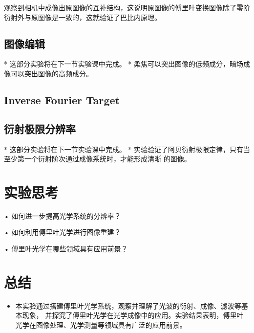 \documentclass{ctexart}
\begin{document}
观察到相机中成像出原图像的互补结构，这说明原图像的傅里叶变换图像除了零阶衍射外与原图像是一致的，这就验证了巴比内原理。

\subsection{图像编辑}
* 这部分实验将在下一节实验课中完成。
* 柔焦可以突出图像的低频成分，暗场成像可以突出图像的高频成分。
\subsection{Inverse Fourier Target}
\subsection{衍射极限分辨率}
* 这部分实验将在下一节实验课中完成。
* 实验验证了阿贝衍射极限定律，只有当至少第一个衍射阶次通过成像系统时，才能形成清晰
的图像。


\section{实验思考}
• 如何进一步提高光学系统的分辨率？

• 如何利用傅里叶光学进行图像重建？

• 傅里叶光学在哪些领域具有应用前景？

\section{总结}
\begin{itemize}
  \item 本实验通过搭建傅里叶光学系统，观察并理解了光波的衍射、成像、滤波等基本现象，
  并探究了傅里叶光学在光学成像中的应用。实验结果表明，傅里叶光学在图像处理、光学测量等领域具有广泛的应用前景。

\end{itemize}
\end{document}

